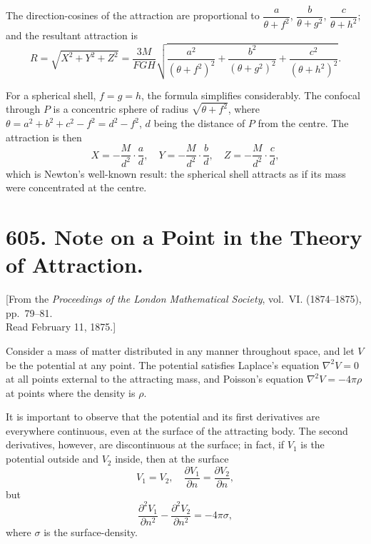 \documentclass[11pt,a4paper]{book}
\begin{document}
\begin{art}
The direction-cosines of the attraction are proportional to $\dfrac{a}{\theta+f^2}$, $\dfrac{b}{\theta+g^2}$, $\dfrac{c}{\theta+h^2}$; and the resultant attraction is
\[
R = \sqrt{X^2 + Y^2 + Z^2}
= \frac{3M}{F G H}\sqrt{\frac{a^2}{(\theta+f^2)^2} + \frac{b^2}{(\theta+g^2)^2} + \frac{c^2}{(\theta+h^2)^2}}.
\]
\end{art}

\begin{art}
For a spherical shell, $f=g=h$, the formula simplifies considerably. The confocal through $P$ is a concentric sphere of radius $\sqrt{\theta + f^2}$, where $\theta = a^2 + b^2 + c^2 - f^2 = d^2 - f^2$, $d$ being the distance of $P$ from the centre. The attraction is then
\[
X = -\frac{M}{d^2}\cdot\frac{a}{d},\quad
Y = -\frac{M}{d^2}\cdot\frac{b}{d},\quad
Z = -\frac{M}{d^2}\cdot\frac{c}{d},
\]
which is Newton's well-known result: the spherical shell attracts as if its mass were concentrated at the centre.
\end{art}


\newpage
\section[Note on a Point in the Theory of Attraction]%
{605. Note on a Point in the Theory of Attraction.}

\begin{center}
{\small [From the \textit{Proceedings of the London Mathematical Society}, vol.~VI. (1874--1875), pp.~79--81.\\
Read February 11, 1875.]}
\end{center}

\begin{art}
Consider a mass of matter distributed in any manner throughout space, and let $V$ be the potential at any point. The potential satisfies Laplace's equation $\nabla^2 V = 0$ at all points external to the attracting mass, and Poisson's equation $\nabla^2 V = -4\pi\rho$ at points where the density is $\rho$.
\end{art}

\begin{art}
It is important to observe that the potential and its first derivatives are everywhere continuous, even at the surface of the attracting body. The second derivatives, however, are discontinuous at the surface; in fact, if $V_1$ is the potential outside and $V_2$ inside, then at the surface
\[
V_1 = V_2, \quad \frac{\partial V_1}{\partial n} = \frac{\partial V_2}{\partial n},
\]
but
\[
\frac{\partial^2 V_1}{\partial n^2} - \frac{\partial^2 V_2}{\partial n^2} = -4\pi\sigma,
\]
where $\sigma$ is the surface-density.
\end{art}
\end{document}
